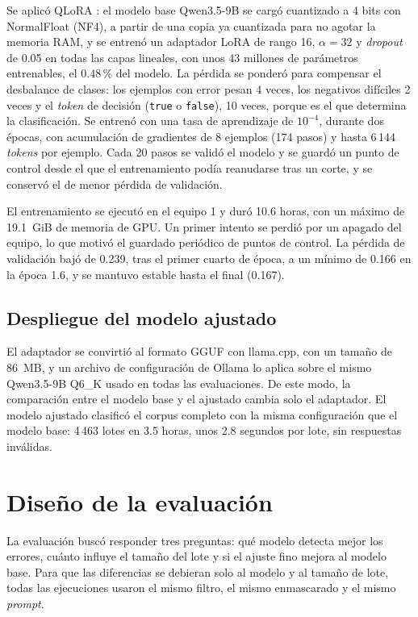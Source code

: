 Se aplicó QLoRA \cite{dettmers2023_qlora}: el modelo base Qwen3.5-9B se cargó cuantizado a 4 bits con NormalFloat (NF4), a partir de una copia ya cuantizada para no agotar la memoria RAM, y se entrenó un adaptador LoRA de rango 16, $\alpha = 32$ y \textit{dropout} de 0.05 en todas las capas lineales, con unos 43 millones de parámetros entrenables, el 0.48\,\% del modelo. La pérdida se ponderó para compensar el desbalance de clases: los ejemplos con error pesan 4 veces, los negativos difíciles 2 veces y el \textit{token} de decisión (\texttt{true} o \texttt{false}), 10 veces, porque es el que determina la clasificación. Se entrenó con una tasa de aprendizaje de $10^{-4}$, durante dos épocas, con acumulación de gradientes de 8 ejemplos (174 pasos) y hasta 6\,144 \textit{tokens} por ejemplo. Cada 20 pasos se validó el modelo y se guardó un punto de control desde el que el entrenamiento podía reanudarse tras un corte, y se conservó el de menor pérdida de validación.

El entrenamiento se ejecutó en el equipo 1 y duró 10.6 horas, con un máximo de 19.1~GiB de memoria de GPU. Un primer intento se perdió por un apagado del equipo, lo que motivó el guardado periódico de puntos de control. La pérdida de validación bajó de 0.239, tras el primer cuarto de época, a un mínimo de 0.166 en la época 1.6, y se mantuvo estable hasta el final (0.167).

\subsection{Despliegue del modelo ajustado}

El adaptador se convirtió al formato GGUF con llama.cpp, con un tamaño de 86~MB, y un archivo de configuración de Ollama lo aplica sobre el mismo Qwen3.5-9B Q6\_K usado en todas las evaluaciones. De este modo, la comparación entre el modelo base y el ajustado cambia solo el adaptador. El modelo ajustado clasificó el corpus completo con la misma configuración que el modelo base: 4\,463 lotes en 3.5 horas, unos 2.8 segundos por lote, sin respuestas inválidas.

\section{Diseño de la evaluación}\label{sec:met_evaluacion}

La evaluación buscó responder tres preguntas: qué modelo detecta mejor los errores, cuánto influye el tamaño del lote y si el ajuste fino mejora al modelo base. Para que las diferencias se debieran solo al modelo y al tamaño de lote, todas las ejecuciones usaron el mismo filtro, el mismo enmascarado y el mismo \textit{prompt}.


